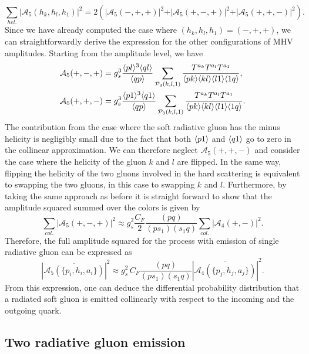\begin{equation}
\sum_{hel.} \vert \mathcal{A}_5(h_k,h_l,h_1) \vert^2=2\left( \vert \mathcal{A}_5(-,+,+) \vert^2 + \vert \mathcal{A}_5(+,-,+) \vert^2+ \vert \mathcal{A}_5(+,+,-) \vert^2 \right).
\end{equation}
Since we have already computed the case where $(h_k,h_l,h_1)=(-,+,+)$, we can straightforwardly derive the expression for the other configurations of MHV amplitudes. Starting from the amplitude level, we have
\begin{align}
\mathcal{A}_5(+,-,+) & =g^3_s \frac{\langle pl\rangle^3\langle ql\rangle}{\langle qp\rangle}  \sum_{\mathcal{P}_3(k,l,1)} \frac{T^{a_k}T^{a_l}T^{a_1}}{\langle pk\rangle \langle kl\rangle \langle l1\rangle \langle1q\rangle}, \\
\mathcal{A}_5(+,+,-) &=g^3_s \frac{\langle p1\rangle^3\langle q1\rangle}{\langle qp\rangle}  \sum_{\mathcal{P}_3(k,l,1)} \frac{T^{a_k}T^{a_l}T^{a_1}}{\langle pk\rangle \langle kl\rangle \langle l1\rangle \langle1q\rangle}. 
\end{align}
The contribution from the case where the soft radiative gluon has the minus helicity is negligibly small due to the fact that both $\langle p1\rangle$ and $\langle q1\rangle$ go to zero in the collinear approximation. We can therefore neglect $\mathcal{A}_5(+,+,-)$ and consider the case where the helicity of the gluon $k$ and $l$ are flipped. In the same way, flipping the helicity of the two gluons involved in the hard scattering is equivalent to swapping the two gluons, in this case to swapping $k$ and $l$. Furthermore, by taking the same approach as before it is straight forward to show that the amplitude squared summed over the colors is given by
\begin{equation}
\sum_{col.} \vert \mathcal{A}_5(+,-,+) \vert^2 \approx g^2_s \frac{C_F}{2} \frac{(p q)}{(p s_1) (s_1 q)} \sum_{col.} \vert \mathcal{A}_4(+,-)\vert^2.
\end{equation} 
Therefore, the full amplitude squared for the process with emission of single radiative gluon can be expressed as 
\begin{equation}
\left| \overline{\mathcal{A}_5(\{p_i,h_i,a_i\})} \right|^2 \approx g^2_s \, C_F \frac{(p q)}{(p s_1) (s_1 q)} \left| \overline{\mathcal{A}_4(\{p_j,h_j,a_j\})}  \right|^2. 
\end{equation}
From this expression, one can deduce the differential probability distribution that a radiated soft gluon is emitted collinearly with respect to the incoming and the outgoing quark. 

\subsection{Two radiative gluon emission}
\label{2radiative}

